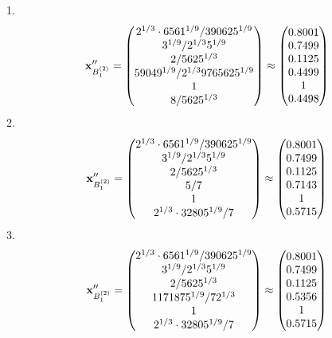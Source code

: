 \documentclass[10pt,a4paper]{article}
\begin{document}
	1.
	\[
		\bold{x}''_{B_1^{(2)}} = 
		\begin{pmatrix}
			{{2^ {1 / 3}} \cdot {6561^ {1 / 9}}} / {{390625^ {1 / 9}}} \\
			{{3^ {1 / 9}}} / {{2^ {1 / 3}}{5^ {1 / 9}}} \\
			{{2}} / {{5625^ {1 / 3}}} \\
			{{59049^ {1 / 9}}} / {{2^ {1 / 3}}{9765625^ {1 / 9}}} \\
			{1}{} \\
			{{8}} / {{5625^ {1 / 3}}} \\
		\end{pmatrix}
		\approx
		\begin{pmatrix}
			0.8001   \\
			0.7499   \\
			0.1125   \\
			0.4499   \\
			1        \\
			0.4498   \\
		\end{pmatrix}
	\]
	2.
	\[
		\bold{x}''_{B_1^{(2)}} = 
		\begin{pmatrix}
			{{2^ {1 / 3}} \cdot {6561^ {1 / 9}}} / {{390625^ {1 / 9}}} \\
			{{3^ {1 / 9}}} / {{2^ {1 / 3}}{5^ {1 / 9}}} \\
			{{2}} / {{5625^ {1 / 3}}} \\
			{{5}} / {{7}} \\
			{1}{} \\
			{{2^ {1 / 3}} \cdot {32805^ {1 / 9}}} / {{7}} \\
		\end{pmatrix}
		\approx
		\begin{pmatrix}
			0.8001   \\
			0.7499   \\
			0.1125   \\
			0.7143   \\
			1        \\
			0.5715   \\
		\end{pmatrix}
	\]
	3.
	\[
		\bold{x}''_{B_1^{(2)}} = 
		\begin{pmatrix}
			{{2^ {1 / 3}} \cdot {6561^ {1 / 9}}} / {{390625^ {1 / 9}}} \\
			{{3^ {1 / 9}}} / {{2^ {1 / 3}}{5^ {1 / 9}}} \\
			{{2}} / {{5625^ {1 / 3}}} \\
			{{1171875^ {1 / 9}}} / {{7}{2^ {1 / 3}}} \\
			{1}{} \\
			{{2^ {1 / 3}} \cdot {32805^ {1 / 9}}} / {{7}} \\
		\end{pmatrix}
		\approx
		\begin{pmatrix}
			0.8001   \\
			0.7499   \\
			0.1125   \\
			0.5356   \\
			1        \\
			0.5715   \\
		\end{pmatrix}
	\]
\end{document}
